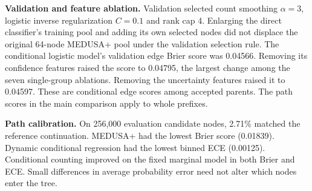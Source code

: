 \textbf{Validation and feature ablation.} Validation selected count smoothing $\alpha=3$, logistic inverse regularization $C=0.1$ and rank cap 4. Enlarging the direct classifier's training pool and adding its own selected nodes did not displace the original 64-node MEDUSA+ pool under the validation selection rule. The conditional logistic model's validation edge Brier score was 0.04566. Removing its confidence features raised the score to 0.04795, the largest change among the seven single-group ablations. Removing the uncertainty features raised it to 0.04597. These are conditional edge scores among accepted parents. The path scores in the main comparison apply to whole prefixes.

\textbf{Path calibration.} On 256,000 evaluation candidate nodes, 2.71\% matched the reference continuation. MEDUSA+ had the lowest Brier score (0.01839). Dynamic conditional regression had the lowest binned ECE (0.00125). Conditional counting improved on the fixed marginal model in both Brier and ECE. Small differences in average probability error need not alter which nodes enter the tree.
